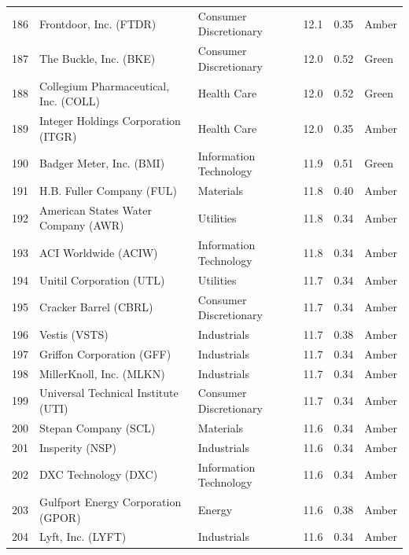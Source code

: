 \documentclass[11pt,a4paper]{article}
\begin{document}
{\begin{longtable}{r p{4.6cm} p{3cm} r r l}
186 & Frontdoor, Inc. (FTDR) & Consumer Discretionary & 12.1 & 0.35 & \cellcolor[HTML]{FFEB9C}Amber \\
187 & The Buckle, Inc. (BKE) & Consumer Discretionary & 12.0 & 0.52 & \cellcolor[HTML]{C6EFCE}Green \\
188 & Collegium Pharmaceutical, Inc. (COLL) & Health Care & 12.0 & 0.52 & \cellcolor[HTML]{C6EFCE}Green \\
189 & Integer Holdings Corporation (ITGR) & Health Care & 12.0 & 0.35 & \cellcolor[HTML]{FFEB9C}Amber \\
190 & Badger Meter, Inc. (BMI) & Information Technology & 11.9 & 0.51 & \cellcolor[HTML]{C6EFCE}Green \\
191 & H.B. Fuller Company (FUL) & Materials & 11.8 & 0.40 & \cellcolor[HTML]{FFEB9C}Amber \\
192 & American States Water Company (AWR) & Utilities & 11.8 & 0.34 & \cellcolor[HTML]{FFEB9C}Amber \\
193 & ACI Worldwide (ACIW) & Information Technology & 11.8 & 0.34 & \cellcolor[HTML]{FFEB9C}Amber \\
194 & Unitil Corporation (UTL) & Utilities & 11.7 & 0.34 & \cellcolor[HTML]{FFEB9C}Amber \\
195 & Cracker Barrel (CBRL) & Consumer Discretionary & 11.7 & 0.34 & \cellcolor[HTML]{FFEB9C}Amber \\
196 & Vestis (VSTS) & Industrials & 11.7 & 0.38 & \cellcolor[HTML]{FFEB9C}Amber \\
197 & Griffon Corporation (GFF) & Industrials & 11.7 & 0.34 & \cellcolor[HTML]{FFEB9C}Amber \\
198 & MillerKnoll, Inc. (MLKN) & Industrials & 11.7 & 0.34 & \cellcolor[HTML]{FFEB9C}Amber \\
199 & Universal Technical Institute (UTI) & Consumer Discretionary & 11.7 & 0.34 & \cellcolor[HTML]{FFEB9C}Amber \\
200 & Stepan Company (SCL) & Materials & 11.6 & 0.34 & \cellcolor[HTML]{FFEB9C}Amber \\
201 & Insperity (NSP) & Industrials & 11.6 & 0.34 & \cellcolor[HTML]{FFEB9C}Amber \\
202 & DXC Technology (DXC) & Information Technology & 11.6 & 0.34 & \cellcolor[HTML]{FFEB9C}Amber \\
203 & Gulfport Energy Corporation (GPOR) & Energy & 11.6 & 0.38 & \cellcolor[HTML]{FFEB9C}Amber \\
204 & Lyft, Inc. (LYFT) & Industrials & 11.6 & 0.34 & \cellcolor[HTML]{FFEB9C}Amber \\

\end{longtable}}
\end{document}
